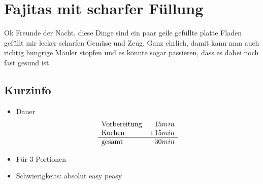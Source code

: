 \section*{Fajitas mit scharfer Füllung}
  \label{Haupt:Fajitas_mit_scharfer_Fuellung}
  Ok Freunde der Nacht, diese Dinge sind ein paar geile gefüllte platte Fladen
  gefüllt mir lecker scharfen Gemüse und Zeug. Ganz ehrlich, damit kann man auch
  richtig hungrige Mäuler stopfen und es könnte sogar passieren, dass es dabei
  noch fast gesund ist.
  \subsection*{Kurzinfo}
    \begin{itemize}
      \item Dauer
        \begin{displaymath}
          \begin{array}{l r}
            \text{Vorbereitung}& 15min \\
            \text{Kochen}& +15min\\ \hline
            \text{gesamt}& 30min
          \end{array}
        \end{displaymath}
      \item Für 3 Portionen
      \item Schwierigkeits: absolut easy peasy
    \end{itemize}
